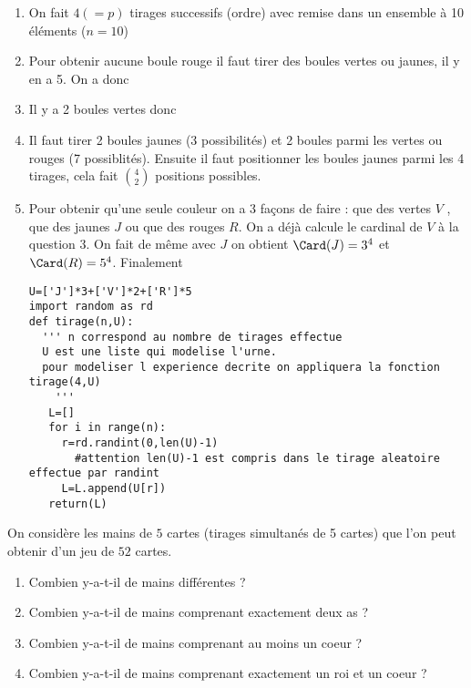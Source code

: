 \documentclass[a4paper, 11pt,reqno]{article}
\begin{document}
\begin{correction}


\begin{enumerate}
\item On fait $4 (=p)$ tirages successifs (ordre) avec remise dans un ensemble à 10 éléments ($n=10$)
\item Pour obtenir aucune boule rouge il faut tirer des boules vertes ou jaunes, il y en  a 5. On  a donc 
\item Il y a 2 boules vertes donc 

\item Il faut tirer 2 boules jaunes (3 possibilités) et 2 boules parmi les vertes ou rouges (7 possiblités). Ensuite il faut positionner les boules jaunes parmi les 4 tirages, cela fait $\binom{4}{2}$ positions possibles. 
\item Pour obtenir qu'une seule couleur on a 3 façons de faire : que des vertes $V$ , que des jaunes $J$ ou que des rouges $R$. 
On a déjà calcule le cardinal de $V$ à la question 3. On fait de même avec $J$ on obtient $\Card(J) =3^4$ et $\Card(R)=5^4$. Finalement 
\begin{lstlisting}
U=['J']*3+['V']*2+['R']*5
import random as rd
def tirage(n,U):
  ''' n correspond au nombre de tirages effectue
  U est une liste qui modelise l'urne. 
  pour modeliser l experience decrite on appliquera la fonction tirage(4,U)
    '''
   L=[]
   for i in range(n):
     r=rd.randint(0,len(U)-1) 
       #attention len(U)-1 est compris dans le tirage aleatoire effectue par randint
     L=L.append(U[r])
   return(L)
\end{lstlisting}


\end{enumerate}
\end{correction}

\vspace{1cm}
\begin{exercice}
On considère les mains  de $5$ cartes (tirages simultanés de 5 cartes) que l'on  peut obtenir d'un jeu de $52$ cartes. 
\begin{enumerate}
\item Combien y-a-t-il de mains différentes ? 
\item  Combien y-a-t-il de mains  comprenant exactement deux as ?
\item  Combien y-a-t-il de mains  comprenant au moins un coeur ?
\item  Combien y-a-t-il de mains  comprenant exactement un roi et un coeur  ?
\end{enumerate}
\end{exercice}
\end{document}
